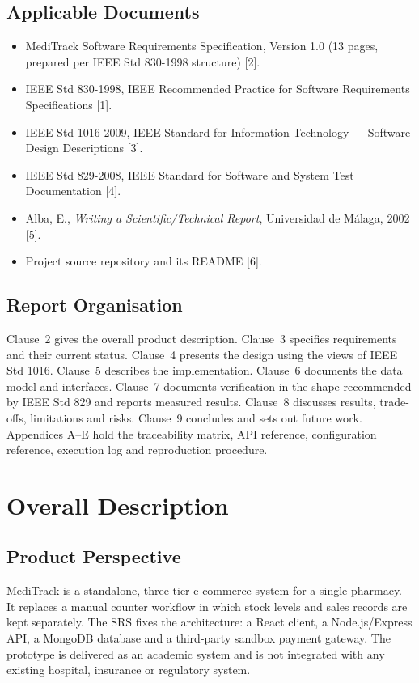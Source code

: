 \documentclass[11pt,a4paper]{article}
\begin{document}
\subsection{Applicable Documents}
\begin{itemize}[leftmargin=1.2em,itemsep=1pt,topsep=2pt]
  \item MediTrack Software Requirements Specification, Version 1.0 (13 pages, prepared per IEEE Std 830-1998 structure) [2].
  \item IEEE Std 830-1998, IEEE Recommended Practice for Software Requirements Specifications [1].
  \item IEEE Std 1016-2009, IEEE Standard for Information Technology --- Software Design Descriptions [3].
  \item IEEE Std 829-2008, IEEE Standard for Software and System Test Documentation [4].
  \item Alba, E., \emph{Writing a Scientific/Technical Report}, Universidad de M\'alaga, 2002 [5].
  \item Project source repository and its README [6].
\end{itemize}

\subsection{Report Organisation}
Clause~2 gives the overall product description. Clause~3 specifies requirements and
their current status. Clause~4 presents the design using the views of IEEE Std 1016.
Clause~5 describes the implementation. Clause~6 documents the data model and
interfaces. Clause~7 documents verification in the shape recommended by IEEE Std 829
and reports measured results. Clause~8 discusses results, trade-offs, limitations and
risks. Clause~9 concludes and sets out future work. Appendices A--E hold the
traceability matrix, API reference, configuration reference, execution log and
reproduction procedure.

\section{Overall Description}

\subsection{Product Perspective}
MediTrack is a standalone, three-tier e-commerce system for a single pharmacy. It
replaces a manual counter workflow in which stock levels and sales records are kept
separately. The SRS fixes the architecture: a React client, a Node.js/Express API, a
MongoDB database and a third-party sandbox payment gateway. The prototype is
delivered as an academic system and is not integrated with any existing hospital,
insurance or regulatory system.
\end{document}
